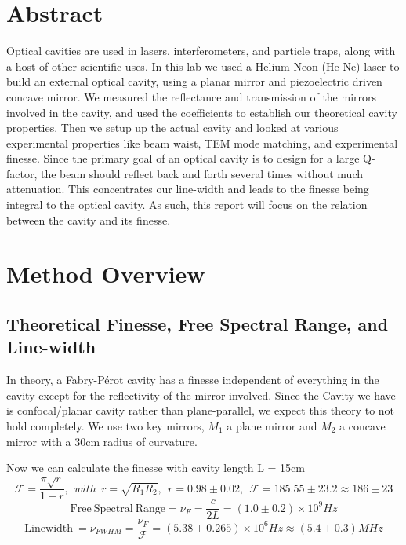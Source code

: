 \documentclass[11pt]{article}
\begin{document}
\section{Abstract}
Optical cavities are used in lasers, interferometers, and particle traps, along with a host of other scientific uses. In this lab we used a Helium-Neon (He-Ne) laser to build an external optical cavity, using a planar mirror and piezoelectric driven concave mirror. We measured the reflectance and transmission of the mirrors involved in the cavity, and used the coefficients to establish our theoretical cavity properties. Then we setup up the actual cavity and looked at various experimental properties like beam waist, TEM mode matching, and experimental finesse. Since the primary goal of an optical cavity is to design for a large Q-factor, the beam should reflect back and forth several times without much attenuation. This concentrates our line-width and leads to the finesse being integral to the optical cavity. As such, this report will focus on the relation between the cavity and its finesse. 
\section{Method Overview}
\subsection{Theoretical Finesse, Free Spectral Range, and Line-width}
In theory, a Fabry-Pérot cavity has a finesse independent of everything in the cavity except for the reflectivity of the mirror involved. Since the Cavity we have is confocal/planar cavity rather than plane-parallel, we expect this theory to not hold completely. We use two key mirrors, $M_1$ a plane mirror and $M_2$ a concave mirror with a 30cm radius of curvature. 

Now we can calculate the finesse with cavity length L = 15cm 
$$\mathscr{F} = \frac{\pi\sqrt{r}}{1-r},\ \ with \ \ r = \sqrt{R_1R_2} ,\ \  r = 0.98 \pm 0.02,\ \  \mathscr{F} = 185.55 \pm 23.2 \approx 186 \pm 23 $$
$$ \mathrm{Free\ Spectral\ Range} = \nu_F = \frac{c}{2L} = (1.0 \pm 0.2)\times 10^9 Hz $$
$$\mathrm{Linewidth}\ = \nu_{FWHM} = \frac{\nu_F}{\mathscr{F}} = (5.38 \pm 0.265 )\times 10^6 Hz \approx (5.4\pm0.3)MHz $$
\end{document}
